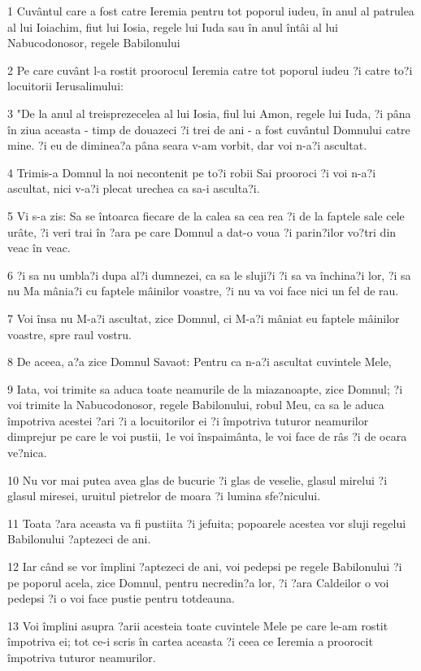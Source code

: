 \par 1 Cuvântul care a fost catre Ieremia pentru tot poporul iudeu, în anul al patrulea al lui Ioiachim, fiut lui Iosia, regele lui Iuda sau în anul întâi al lui Nabucodonosor, regele Babilonului
\par 2 Pe care cuvânt l-a rostit proorocul Ieremia catre tot poporul iudeu ?i catre to?i locuitorii Ierusalimului:
\par 3 "De la anul al treisprezecelea al lui Iosia, fiul lui Amon, regele lui Iuda, ?i pâna în ziua aceasta - timp de douazeci ?i trei de ani - a fost cuvântul Domnului catre mine. ?i eu de diminea?a pâna seara v-am vorbit, dar voi n-a?i ascultat.
\par 4 Trimis-a Domnul la noi necontenit pe to?i robii Sai prooroci ?i voi n-a?i ascultat, nici v-a?i plecat urechea ca sa-i asculta?i.
\par 5 Vi s-a zis: Sa se întoarca fiecare de la calea sa cea rea ?i de la faptele sale cele urâte, ?i veri trai în ?ara pe care Domnul a dat-o voua ?i parin?ilor vo?tri din veac în veac.
\par 6 ?i sa nu umbla?i dupa al?i dumnezei, ca sa le sluji?i ?i sa va închina?i lor, ?i sa nu Ma mânia?i cu faptele mâinilor voastre, ?i nu va voi face nici un fel de rau.
\par 7 Voi însa nu M-a?i ascultat, zice Domnul, ci M-a?i mâniat eu faptele mâinilor voastre, spre raul vostru.
\par 8 De aceea, a?a zice Domnul Savaot: Pentru ca n-a?i ascultat cuvintele Mele,
\par 9 Iata, voi trimite sa aduca toate neamurile de la miazanoapte, zice Domnul; ?i voi trimite la Nabucodonosor, regele Babilonului, robul Meu, ca sa le aduca împotriva acestei ?ari ?i a locuitorilor ei ?i împotriva tuturor neamurilor dimprejur pe care le voi pustii, 1e voi înspaimânta, le voi face de râs ?i de ocara ve?nica.
\par 10 Nu vor mai putea avea glas de bucurie ?i glas de veselie, glasul mirelui ?i glasul miresei, uruitul pietrelor de moara ?i lumina sfe?nicului.
\par 11 Toata ?ara aceasta va fi pustiita ?i jefuita; popoarele acestea vor sluji regelui Babilonului ?aptezeci de ani.
\par 12 Iar când se vor împlini ?aptezeci de ani, voi pedepsi pe regele Babilonului ?i pe poporul acela, zice Domnul, pentru necredin?a lor, ?i ?ara Caldeilor o voi pedepsi ?i o voi face pustie pentru totdeauna.
\par 13 Voi împlini asupra ?arii acesteia toate cuvintele Mele pe care le-am rostit împotriva ei; tot ce-i scris în cartea aceasta ?i ceea ce Ieremia a proorocit împotriva tuturor neamurilor.
